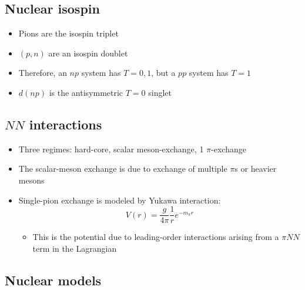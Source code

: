 \subsection{Nuclear isospin}
\begin{itemize}
  \item Pions are the isospin triplet
  \item $(p,n)$ are an isospin doublet
  \item Therefore, an $np$ system has $T = 0,1$, but a $pp$ system has $T=1$
  \item $d(np)$ is the antisymmetric $T=0$ singlet
\end{itemize}

\subsection{$NN$ interactions}
\begin{itemize}
  \item Three regimes: hard-core, scalar meson-exchange, 1 $\pi$-exchange
  \item The scalar-meson exchange is due to exchange of multiple $\pi$s or heavier mesons
  \item Single-pion exchange is modeled by Yukawa interaction:
  \begin{equation}
    V(r) = \frac{g}{4\pi} \frac{1}{r} e^{-m_\pi r}
  \end{equation}
  \begin{itemize}
    \item This is the potential due to leading-order interactions arising from a $\pi NN$ term in the Lagrangian
  \end{itemize}
\end{itemize}

\subsection{Nuclear models}

